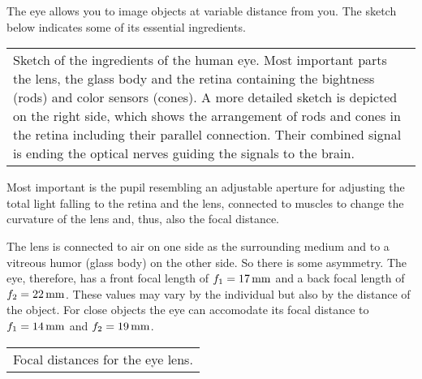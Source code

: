 \documentclass[letterpaper,10pt,english]{sphinxmanual}
\begin{document}
The eye allows you to image objects at variable distance from you. The sketch below indicates some of its essential ingredients.


\begin{savenotes}\sphinxattablestart
\centering
\begin{tabulary}{\linewidth}[t]{|T|}
\hline
\sphinxstyletheadfamily 
{} 
\\
\hline
{} Sketch of the ingredients of the human eye. Most important parts the lens, the glass body and the retina containing the bightness (rods) and color sensors (cones). A more detailed sketch is depicted on the right side, which shows the arrangement of rods and cones in the retina including their parallel connection. Their combined signal is ending the optical nerves guiding the signals to the brain.
\\
\hline
\end{tabulary}
\par
\sphinxattableend\end{savenotes}

Most important is the pupil resembling an adjustable aperture for adjusting the total light falling to the retina and the lens, connected to muscles to change the curvature of the lens and, thus, also the focal distance.

The lens is connected to air on one side as the surrounding medium and to a vitreous humor (glass body) on the other side. So there is some asymmetry. The eye, therefore, has a front focal length of \(f_1=17\,{\rm mm}\) and a back focal length of \(f_2=22\,{\rm mm}\). These values may vary by the individual but also by the distance of the object. For close objects the eye can accomodate its focal distance to \(f_1=14\,{\rm mm}\) and \(f_2=19\,{\rm mm}\).


\begin{savenotes}\sphinxattablestart
\centering
\begin{tabulary}{\linewidth}[t]{|T|}
\hline
\sphinxstyletheadfamily 
{}
\\
\hline
{} Focal distances for the eye lens.
\\
\hline
\end{tabulary}
\par
\sphinxattableend\end{savenotes}
\end{document}
